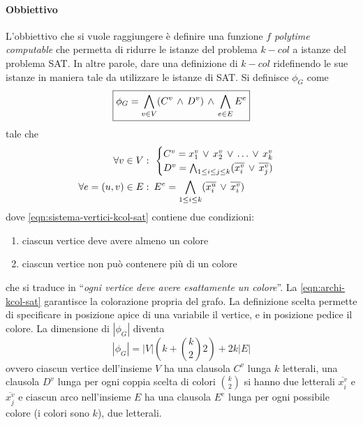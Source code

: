 \paragraph{Obbiettivo}L'obbiettivo che si vuole raggiungere è definire una funzione $f$ \textit{polytime computable} che permetta di ridurre le istanze del problema $k-col$ a istanze del problema SAT. In altre parole, dare una definizione di $k-col$ ridefinendo le sue istanze in maniera tale da utilizzare le istanze di SAT. Si definisce $\phi_G$ come 
\begin{equation}
	\boxed{\phi_G=\bigwedge_{v\in V}(C^v\,\wedge\, D^v)\,\wedge\, \bigwedge_{e\in E}E^e}\label{eqn:f-k-col-sat}
\end{equation}
tale che
\begin{align}
	\forall v\in V \,\colon\,&\begin{cases}
		C^v =x_1^v\,\vee\, x_2^v\,\vee\,\dots\,\vee\, x_k^v\\ D^v=\bigwedge_{1\le i \le j\le k}(\overline{x_i^v}\,\vee\, \overline{x_j^v})
	\end{cases}\label{eqn:sistema-vertici-kcol-sat}\\
	\forall e=(u,v)\in E\,\colon\,& E^e=\bigwedge_{1\le i\le k}(\overline{x_i^u}\,\vee\, \overline{x_i^v})\label{eqn:archi-kcol-sat}
\end{align}
dove \cref{eqn:sistema-vertici-kcol-sat} contiene due condizioni:
\begin{enumerate}
	\item ciascun vertice deve avere almeno un colore
	\item ciascun vertice non può contenere più di un colore
\end{enumerate}
che si traduce in ``\textit{ogni vertice deve avere esattamente un colore}''. La \cref{eqn:archi-kcol-sat} garantisce la colorazione propria del grafo. La definizione scelta permette di specificare in posizione apice di una variabile il vertice, e in posizione pedice il colore. La dimensione di $|\phi_G|$ diventa \[|\phi_G|=|V|\left(k+\binom{k}{2}2\right)+2k|E|\]
ovvero ciascun vertice dell'insieme $V$ ha una clausola $C^v$ lunga $k$ letterali, una clausola $D^v$ lunga 
per ogni coppia scelta di colori $\binom{k}{2}$ si hanno due letterali $\overline{x_i^v}$ e $\overline{x_j^v}$ e ciascun arco nell'insieme $E$ ha una clausola $E^e$ lunga 
per ogni possibile colore (i colori sono $k$), due letterali.

